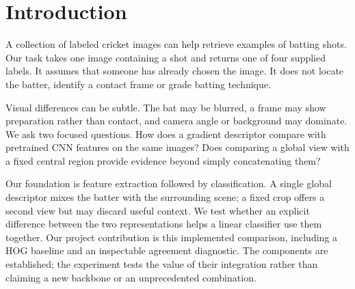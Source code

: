 \begin{abstract}
We study a small, practical task: classify one cricket image as drive, leg glance/flick, pull or sweep. We compare a hand-crafted histogram of oriented gradients (HOG) with frozen MobileNetV2 features followed by a linear classifier. Our implemented extension combines global and fixed regional CNN features with their absolute difference, and exposes disagreement between separate view classifiers. On an unchanged test set of 945 images in 70 visual groups, HOG obtains {{HOG_ACC}}\% accuracy and {{HOG_F1}}\% macro F1; the global CNN obtains {{GLOBAL_ACC}}\% and {{GLOBAL_F1}}\%. Contrast obtains {{ACC}}\% and {{F1}}\%, only three additional correct predictions over concatenation. Group-based uncertainty does not establish a clear advantage. A duplicate audit substantially reduces the optimistic preliminary result, and temperature scaling worsens test calibration. We report these limitations alongside a local demo and reproducible predictions. The study is exploratory because grouping was revised after earlier evaluation.
\end{abstract}

\section{Introduction}
A collection of labeled cricket images can help retrieve examples of batting shots. Our task takes one image containing a shot and returns one of four supplied labels. It assumes that someone has already chosen the image. It does not locate the batter, identify a contact frame or grade batting technique.

Visual differences can be subtle. The bat may be blurred, a frame may show preparation rather than contact, and camera angle or background may dominate. We ask two focused questions. How does a gradient descriptor compare with pretrained CNN features on the same images? Does comparing a global view with a fixed central region provide evidence beyond simply concatenating them?

Our foundation is feature extraction followed by classification. A single global descriptor mixes the batter with the surrounding scene; a fixed crop offers a second view but may discard useful context. We test whether an explicit difference between the two representations helps a linear classifier use them together. Our project contribution is this implemented comparison, including a HOG baseline and an inspectable agreement diagnostic. The components are established; the experiment tests the value of their integration rather than claiming a new backbone or an unprecedented combination.

